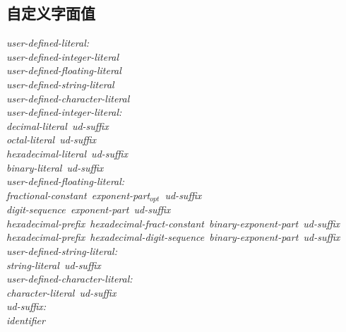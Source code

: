 \subsection{自定义字面值}
\noindent \mbox{\qquad \textit{user-defined-literal:}}                        \\
\mbox{\qquad \qquad \textit{user-defined-integer-literal}}                    \\
\mbox{\qquad \qquad \textit{user-defined-floating-literal}}                   \\
\mbox{\qquad \qquad \textit{user-defined-string-literal}}                     \\
\mbox{\qquad \qquad \textit{user-defined-character-literal}}                  \\
\noindent \mbox{\qquad \textit{user-defined-integer-literal:}}                \\
\mbox{\qquad \qquad \textit{decimal-literal ud-suffix}}                       \\
\mbox{\qquad \qquad \textit{octal-literal ud-suffix}}                         \\
\mbox{\qquad \qquad \textit{hexadecimal-literal ud-suffix}}                   \\
\mbox{\qquad \qquad \textit{binary-literal ud-suffix}}                        \\
\noindent \mbox{\qquad \textit{user-defined-floating-literal:}}               \\
\mbox{\qquad \qquad \textit{fractional-constant exponent-part$_{opt}$
                            ud-suffix}}                                       \\
\mbox{\qquad \qquad \textit{digit-sequence exponent-part ud-suffix}}          \\
\mbox{\qquad \qquad \textit{hexadecimal-prefix hexadecimal-fract-constant
                            binary-exponent-part ud-suffix}}                  \\
\mbox{\qquad \qquad \textit{hexadecimal-prefix hexadecimal-digit-sequence
                            binary-exponent-part ud-suffix}}                  \\
\noindent \mbox{\qquad \textit{user-defined-string-literal:}}                 \\
\mbox{\qquad \qquad \textit{string-literal ud-suffix}}                        \\
\noindent \mbox{\qquad \textit{user-defined-character-literal:}}              \\
\mbox{\qquad \qquad \textit{character-literal ud-suffix}}                     \\
\noindent \mbox{\qquad \textit{ud-suffix:}}                                   \\
\mbox{\qquad \qquad \textit{identifier}}                                      \\

